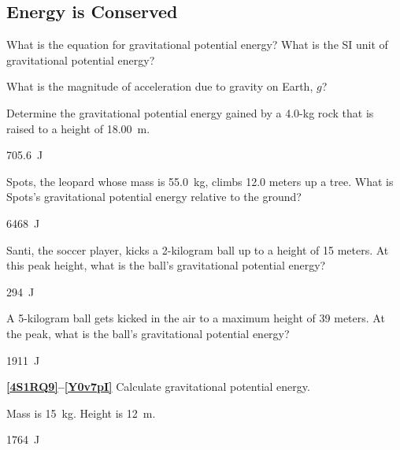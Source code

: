 \documentclass[]{exam}
\begin{document}
\begin{questions}
\clearpage

\subsection{Energy is Conserved}

\begin{questions}
    


\question \label{xxSTEr}
What is the equation for gravitational potential energy? What is the SI unit of gravitational potential energy?


\question
What is the magnitude of acceleration due to gravity on Earth, $g$?


\question \label{9p9meZ}
Determine the gravitational potential energy gained by a 4.0-kg rock that is raised to a height of \SI{18.00}{m}.

\begin{solution}
\SI{705.6}{J}
\end{solution}


\question \label{i6NTnH}
Spots, the leopard whose mass is \SI{55.0}{kg}, climbs 12.0 meters up a tree. What is Spots's gravitational potential energy relative to the ground?

\begin{solution}
\SI{6468}{J}
\end{solution}

\question \label{FAhPt5}
Santi, the soccer player, kicks a 2-kilogram ball up to a height of 15 meters. At this peak height, what is the ball's gravitational potential energy?

\begin{solution}
\SI{294}{J}
\end{solution}


\question \label{Nn51QC}
A 5-kilogram ball gets kicked in the air to a maximum height of 39 meters. At the peak, what is the ball's gravitational potential energy?

\begin{solution}
\SI{1911}{J}
\end{solution}

\textbf{\ref{4S1RQ9}--\ref{Y0v7pI}} Calculate gravitational potential energy.

\question \label{4S1RQ9}
Mass is \SI{15}{kg}. Height is \SI{12}{m}.

\begin{solution}
\SI{1764}{J}
\end{solution}



\end{questions}
\end{questions}
\end{document}
